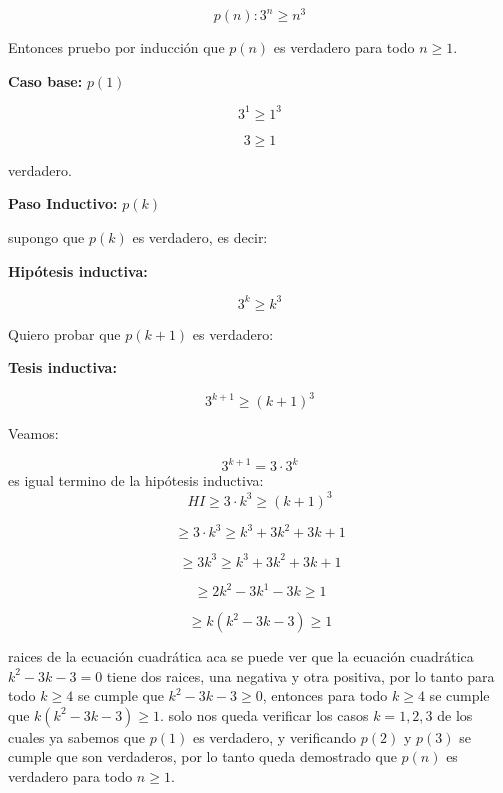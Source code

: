 \begin{ejercicio}
\[
p(n): 3^n \geq n^3 
\]

Entonces pruebo por inducción que $p(n)$ es verdadero para todo $n\geq 1$.

\textbf{Caso base:} $p(1)$

\[
3^1 \geq 1^3
\]

\[
3 \geq 1 
\]

verdadero.

\textbf{Paso Inductivo:} $p(k)$

\vspace{0.5cm}
supongo que $p(k)$ es verdadero, es decir:

\textbf{Hipótesis inductiva:} 

\[
3^k \geq k^3
\]

Quiero probar que $p(k+1)$ es verdadero:

\textbf{Tesis inductiva:}

\[
3^{k+1} \geq (k+1)^3
\]

Veamos:

\[ 
3^{k+1} = 3 \cdot 3^k
\]
es igual termino de la hipótesis inductiva:
\[ 
HI \geq 3 \cdot k^3 \geq  (k+1)^3
\]

\[ 
\geq 3 \cdot k^3 \geq k^3 + 3k^2 + 3k + 1
\]

\[ 
\geq 3k^3 \geq k^3 + 3k^2 + 3k + 1
\]

\[ 
\geq 2k^2 - 3k^1 - 3k \geq 1
\]

\[ 
\geq k(k^2 - 3k - 3) \geq 1
\]

\begin{solucion}{raices de la ecuación cuadrática}
aca se puede ver que la ecuación cuadrática $k^2 - 3k - 3 = 0$ tiene dos raices, una negativa y otra positiva, por lo tanto para todo $k \geq 4$ se cumple que $k^2 - 3k - 3 \geq 0$, entonces para todo $k \geq 4$ se cumple que $k(k^2 - 3k - 3) \geq 1$.
solo nos queda verificar los casos $k=1,2,3$ de los cuales ya sabemos que $p(1)$ es verdadero, y verificando $p(2)$ y $p(3)$ se cumple que son verdaderos, por lo tanto queda demostrado que $p(n)$ es verdadero para todo $n \geq 1$.
\end{solucion}

\end{ejercicio}

